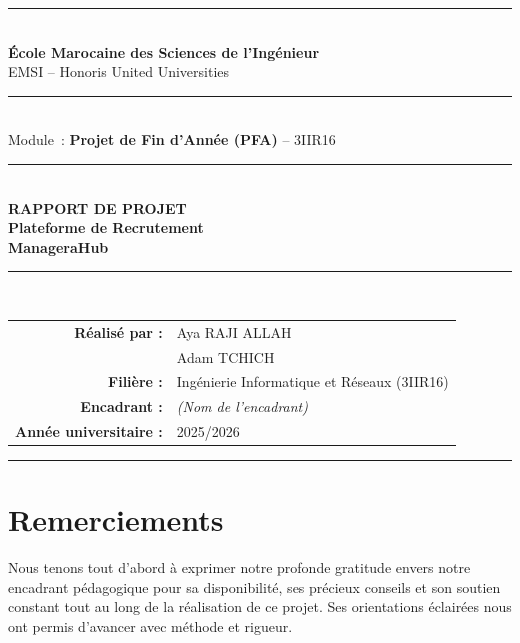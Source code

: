 \documentclass[12pt,a4paper]{report}
\begin{document}
\begin{titlepage}
\centering
{\color{darkplum}\rule{\linewidth}{2pt}}\\[0.4cm]
{\Large\textbf{École Marocaine des Sciences de l'Ingénieur}}\\[0.1cm]
{\large EMSI -- Honoris United Universities}\\[0.1cm]
{\color{darkplum}\rule{\linewidth}{0.5pt}}\\[1cm]

{\large Module~: \textbf{Projet de Fin d'Année (PFA)} -- 3IIR16}\\[1.5cm]

{\color{darkplum}\rule{0.8\linewidth}{1pt}}\\[0.4cm]
{\Huge\bfseries\color{darkplum} RAPPORT DE PROJET}\\[0.3cm]
{\LARGE\bfseries Plateforme de Recrutement}\\[0.2cm]
{\huge\bfseries\color{darkplum} ManageraHub}\\[0.4cm]
{\color{darkplum}\rule{0.8\linewidth}{1pt}}\\[2cm]

\begin{tabular}{rl}
\textbf{Réalisé par :} & Aya RAJI ALLAH \\[0.2cm]
                       & Adam TCHICH \\[0.8cm]
\textbf{Filière :}     & Ingénierie Informatique et Réseaux (3IIR16) \\[0.2cm]
\textbf{Encadrant :}   & \textit{(Nom de l'encadrant)} \\[0.8cm]
\textbf{Année universitaire :} & 2025/2026
\end{tabular}

\vfill
{\color{darkplum}\rule{\linewidth}{2pt}}
\end{titlepage}

\chapter*{Remerciements}
\thispagestyle{plain}

Nous tenons tout d'abord à exprimer notre profonde gratitude envers notre encadrant pédagogique pour sa disponibilité, ses précieux conseils et son soutien constant tout au long de la réalisation de ce projet. Ses orientations éclairées nous ont permis d'avancer avec méthode et rigueur.
\end{document}
